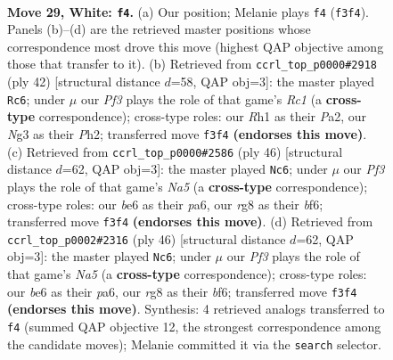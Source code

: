 \documentclass[11pt]{article}
\begin{document}
\clearpage

\begin{figure}[p]\centering
\begin{subfigure}{0.46\textwidth}\centering
\resizebox{\linewidth}{!}{%
\newchessgame
\chessboard[
  setfen={r4kr1/1p3p1p/4b1p1/p2p4/8/3K1PN1/PP2B1PP/2R4R w - - 0 29},
  showmover=false,
  pgfstyle=straightmove, color=movearrow, markmove={f3-f4}
]}
\caption{}
\end{subfigure}\hfill
\begin{subfigure}{0.46\textwidth}\centering
\resizebox{\linewidth}{!}{%
\newchessgame
\chessboard[
  setfen={r3k2r/3nbpp1/p2p4/N2Pp2p/8/4BPP1/P4K1P/2RR4 w kq - 1 22},
  showmover=false,
  pgfstyle=straightmove, color=movearrow, markmove={c1-c6}
]}
\caption{}
\end{subfigure}
\\[4pt]
\begin{subfigure}{0.46\textwidth}\centering
\resizebox{\linewidth}{!}{%
\newchessgame
\chessboard[
  setfen={r3k2r/3n1pp1/p2p1b2/N2P3p/P7/3pBPP1/5K1P/2R4R w kq - 0 24},
  showmover=false,
  pgfstyle=straightmove, color=movearrow, markmove={a5-c6}
]}
\caption{}
\end{subfigure}\hfill
\begin{subfigure}{0.46\textwidth}\centering
\resizebox{\linewidth}{!}{%
\newchessgame
\chessboard[
  setfen={r3k2r/3n1pp1/p2p1b2/N2P3p/P7/3pBPP1/5K1P/2R4R w kq - 0 24},
  showmover=false,
  pgfstyle=straightmove, color=movearrow, markmove={a5-c6}
]}
\caption{}
\end{subfigure}
\caption{\textbf{Move 29, White: \texttt{f4}.} (a) Our position; Melanie plays \texttt{f4} (\texttt{f3f4}). Panels (b)--(d) are the retrieved master positions whose correspondence most drove this move (highest QAP objective among those that transfer to it). (b) Retrieved from \texttt{ccrl\_top\_p0000\#2918} (ply 42) [structural distance $d$=58, QAP obj=3]: the master played \texttt{Rc6}; under $\mu$ our \emph{Pf3} plays the role of that game's \emph{Rc1} (a \textbf{cross-type} correspondence); cross-type roles: our \emph{R}h1 as their \emph{P}a2, our \emph{N}g3 as their \emph{P}h2; transferred move \texttt{f3f4} \textbf{(endorses this move)}. (c) Retrieved from \texttt{ccrl\_top\_p0000\#2586} (ply 46) [structural distance $d$=62, QAP obj=3]: the master played \texttt{Nc6}; under $\mu$ our \emph{Pf3} plays the role of that game's \emph{Na5} (a \textbf{cross-type} correspondence); cross-type roles: our \emph{b}e6 as their \emph{p}a6, our \emph{r}g8 as their \emph{b}f6; transferred move \texttt{f3f4} \textbf{(endorses this move)}. (d) Retrieved from \texttt{ccrl\_top\_p0002\#2316} (ply 46) [structural distance $d$=62, QAP obj=3]: the master played \texttt{Nc6}; under $\mu$ our \emph{Pf3} plays the role of that game's \emph{Na5} (a \textbf{cross-type} correspondence); cross-type roles: our \emph{b}e6 as their \emph{p}a6, our \emph{r}g8 as their \emph{b}f6; transferred move \texttt{f3f4} \textbf{(endorses this move)}. Synthesis: 4 retrieved analogs transferred to \texttt{f4} (summed QAP objective 12, the strongest correspondence among the candidate moves); Melanie committed it via the \texttt{search} selector.}
\label{fig:thought-m56}
\end{figure}
\end{document}
